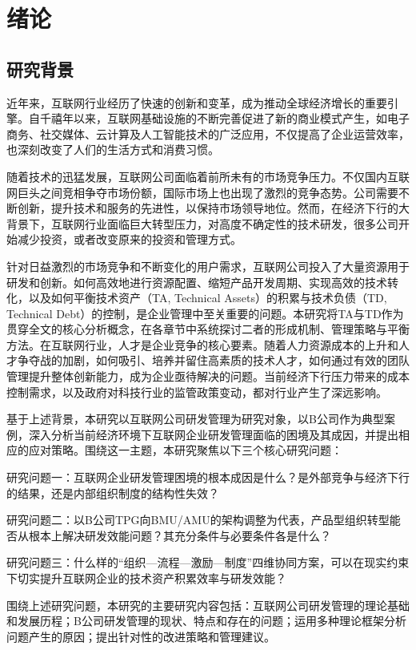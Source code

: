 
\chapter{绪论}

\section{研究背景}

近年来，互联网行业经历了快速的创新和变革，成为推动全球经济增长的重要引擎。自千禧年以来，互联网基础设施的不断完善促进了新的商业模式产生，如电子商务、社交媒体、云计算及人工智能技术的广泛应用，不仅提高了企业运营效率，也深刻改变了人们的生活方式和消费习惯。

随着技术的迅猛发展，互联网公司面临着前所未有的市场竞争压力。不仅国内互联网巨头之间竞相争夺市场份额，国际市场上也出现了激烈的竞争态势。公司需要不断创新，提升技术和服务的先进性，以保持市场领导地位。然而，在经济下行的大背景下，互联网行业面临巨大转型压力，对高度不确定性的技术研发，很多公司开始减少投资，或者改变原来的投资和管理方式。

针对日益激烈的市场竞争和不断变化的用户需求，互联网公司投入了大量资源用于研发和创新。如何高效地进行资源配置、缩短产品开发周期、实现高效的技术转化，以及如何平衡技术资产（TA, Technical Assets）的积累与技术负债（TD, Technical Debt）的控制，是企业管理中至关重要的问题。本研究将TA与TD作为贯穿全文的核心分析概念，在各章节中系统探讨二者的形成机制、管理策略与平衡方法。在互联网行业，人才是企业竞争的核心要素。随着人力资源成本的上升和人才争夺战的加剧，如何吸引、培养并留住高素质的技术人才，如何通过有效的团队管理提升整体创新能力，成为企业亟待解决的问题。当前经济下行压力带来的成本控制需求，以及政府对科技行业的监管政策变动，都对行业产生了深远影响。

基于上述背景，本研究以互联网公司研发管理为研究对象，以B公司作为典型案例，深入分析当前经济环境下互联网企业研发管理面临的困境及其成因，并提出相应的应对策略。围绕这一主题，本研究聚焦以下三个核心研究问题：

研究问题一：互联网企业研发管理困境的根本成因是什么？是外部竞争与经济下行的结果，还是内部组织制度的结构性失效？

研究问题二：以B公司TPG向BMU/AMU的架构调整为代表，产品型组织转型能否从根本上解决研发效能问题？其充分条件与必要条件各是什么？

研究问题三：什么样的“组织—流程—激励—制度”四维协同方案，可以在现实约束下切实提升互联网企业的技术资产积累效率与研发效能？

围绕上述研究问题，本研究的主要研究内容包括：互联网公司研发管理的理论基础和发展历程；B公司研发管理的现状、特点和存在的问题；运用多种理论框架分析问题产生的原因；提出针对性的改进策略和管理建议。

